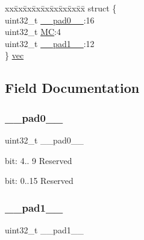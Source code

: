 \begin{DoxyCompactItemize}
\begin{tabbing}
\end{tabbing}\item 
\begin{tabbing}
xx\=xx\=xx\=xx\=xx\=xx\=xx\=xx\=xx\=\kill
struct \{\\
\>uint32\_t \mbox{\hyperlink{union_t_c_c___i_n_t_e_n_s_e_t___type_a3e57c2ef1c3ffb36722f000cc1156824}{\_\_pad0\_\_}}:16\\
\>uint32\_t \mbox{\hyperlink{union_t_c_c___i_n_t_e_n_s_e_t___type_a99b527974739f53477a2c1bca4970331}{MC}}:4\\
\>uint32\_t \mbox{\hyperlink{union_t_c_c___i_n_t_e_n_s_e_t___type_a6712ba6dd1d5b43d2d56ff8ac4e275a7}{\_\_pad1\_\_}}:12\\
\} \mbox{\hyperlink{union_t_c_c___i_n_t_e_n_s_e_t___type_a733ccd1522955a4f9ad933d7ab039844}{vec}}\\

\end{tabbing}\end{DoxyCompactItemize}


\subsection{Field Documentation}
\mbox{\label{union_t_c_c___i_n_t_e_n_s_e_t___type_a3e57c2ef1c3ffb36722f000cc1156824}} 
\subsubsection{\texorpdfstring{\_\_pad0\_\_}{\_\_pad0\_\_}}
{\footnotesize\ttfamily uint32\+\_\+t \+\_\+\+\_\+pad0\+\_\+\+\_\+}

bit\+: 4.. 9 Reserved

bit\+: 0..15 Reserved \mbox{\label{union_t_c_c___i_n_t_e_n_s_e_t___type_a6712ba6dd1d5b43d2d56ff8ac4e275a7}} 
\subsubsection{\texorpdfstring{\_\_pad1\_\_}{\_\_pad1\_\_}}
{\footnotesize\ttfamily uint32\+\_\+t \+\_\+\+\_\+pad1\+\_\+\+\_\+}

